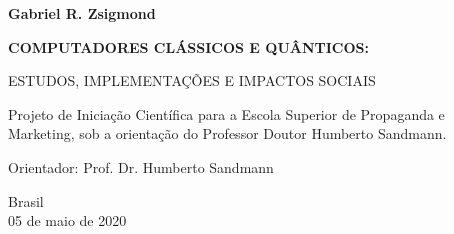 \begin{titlepage}

    \begin{center}
        
        \textbf{Gabriel R. Zsigmond}
        
        \vspace{3cm}
        
        \LARGE
        \textbf{COMPUTADORES CLÁSSICOS E QUÂNTICOS:}
        
        \vspace{0.5cm}
        \large
        ESTUDOS, IMPLEMENTAÇÕES E IMPACTOS SOCIAIS
        
        \vspace{3.5cm}
        
        \begin{flushright}
        \begin{minipage}{8cm}
        Projeto de Iniciação Científica para a Escola Superior de Propaganda e Marketing, sob a orientação do Professor Doutor Humberto Sandmann.\linebreak[3]
        
        Orientador: Prof. Dr. Humberto Sandmann
        \end{minipage}
        \end{flushright}
        \vfill
        
        Brasil\\
        05 de maio de 2020\\
        
    \end{center}

\end{titlepage}